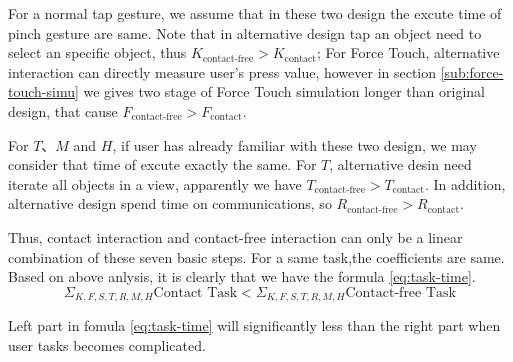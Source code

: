 For a normal tap gesture, we assume that in these two design the excute time of pinch gesture are same. Note that in alternative design tap an object need to select an specific object, thus $K_{\text{contact-free}}>K_{\text{contact}}$; For Force Touch, alternative interaction can directly measure user's press value, however in section \ref{sub:force-touch-simu} we gives two stage of Force Touch simulation longer than original design, that cause $F_{\text{contact-free}}>F_{\text{contact}}$.

For $T$、$M$ and $H$, if user has already familiar with these two design, we may consider that time of excute exactly the same. For $T$, alternative desin need iterate all objects in a view, apparently we have $T_{\text{contact-free}}>T_{\text{contact}}$. In addition, alternative design spend time on communications, so $R_{\text{contact-free}}>R_{\text{contact}}$.

Thus, contact interaction and contact-free interaction can only be a linear combination of these seven basic steps. For a same task,the coefficients are same. Based on above anlysis, it is clearly that we have the formula \ref{eq:task-time}.
\begin{equation}
    \label{eq:task-time}
    \Sigma_{K,F,S,T,R,M,H}{\text{Contact Task}} < \Sigma_{K,F,S,T,R,M,H}{\text{Contact-free Task}}
\end{equation}

Left part in fomula \ref{eq:task-time}  will significantly less than the right part when user tasks becomes complicated.

